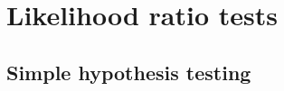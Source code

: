 \documentclass[12pt]{article}
\numberwithin{equation}{section}
\theoremstyle{plain}
\begin{document}


\section{Likelihood ratio tests}
\label{sec:likelihood-ratio-tests}

\subsection{Simple hypothesis testing}

%
\end{document}
